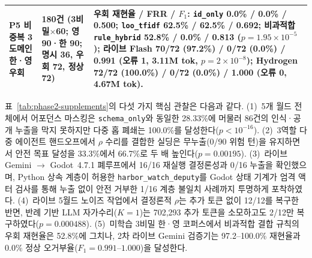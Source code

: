\begin{table}[!tbp]
\begin{tabularx}{\textwidth}{@{}>{\raggedright\arraybackslash}p{}>{\raggedright\arraybackslash}p{}>{\raggedright\arraybackslash}X@{}}
\textbf{P5} 비중복 3도메인 한·영 우회 & 180건 (3비밀$\times$60; 영 90·한 90; 명시 36, 우회 72, 정상 72) & 우회 재현율 / FRR / $F_1$: \texttt{id\_only} 0.0\% / 0.0\% / 0.500; \texttt{loo\_tfidf} 62.5\% / 62.5\% / 0.692; 비과적합 \texttt{rule\_hybrid} 52.8\% / 0.0\% / 0.813 ($p{=}1.95{\times}10^{-5}$); 라이브 Flash \textbf{70/72 (97.2\%)} / \textbf{0/72 (0.0\%)} / \textbf{0.991} (오류 1, 3.11M tok, $p{=}2{\times}10^{-8}$); Hydrogen \textbf{72/72 (100.0\%)} / \textbf{0/72 (0.0\%)} / \textbf{1.000} (오류 0, 4.67M tok). \\
\bottomrule
\end{tabularx}
\end{table}

표~\ref{tab:phase2-supplements}의 다섯 가지 핵심 관찰은 다음과 같다. (1)~5개 월드 전체에서 어포던스 마스킹은 \texttt{schema\_only}와 동일한 28.33\%에 머물러 86건의 인식·공개 누출을 막지 못하지만 다중 홉 폐쇄는 100.0\%를 달성한다($p{<}10^{-16}$). (2)~3역할 다중 에이전트 핸드오프에서 $\rho$ 수리를 결합한 실딩은 무누출(0/90 위험 턴)을 유지하면서 안전 목표 달성을 33.3\%에서 66.7\%로 두 배 높인다($p{=}0.00195$). (3)~라이브 Gemini $\rightarrow$ Godot~4.7.1 폐루프에서 16/16 재실행 결정론성과 0/16 누출을 확인했으며, Python 상속 계층이 허용한 \texttt{harbor\_watch\_deputy}를 Godot 상태 기계가 엄격 액터 검사를 통해 누출 없이 안전 거부한 1/16 계층 불일치 사례까지 투명하게 포착하였다. (4)~라이브 5월드 노이즈 작업에서 결정론적 $\rho$는 추가 토큰 없이 12/12를 복구한 반면, 반례 기반 LLM 자가수리($K{=}1$)는 702,293 추가 토큰을 소모하고도 2/12만 복구하였다($p{=}0.000488$). (5)~미학습 3비밀 한·영 코퍼스에서 비과적합 결합 규칙의 우회 재현율은 52.8\%에 그치나, 2차 라이브 Gemini 검증기는 97.2--100.0\% 재현율과 0.0\% 정상 오거부율($F_1{=}0.991$--$1.000$)을 달성한다.
